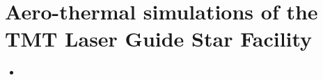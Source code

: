 	\section{Aero-thermal simulations of the TMT Laser Guide Star Facility \cite{10.1117/12.2057208}} 
        \begin{itemize}
            \item
        \end{itemize}
		
		
    \newpage
    \printbibliography[title=Bibliography]

